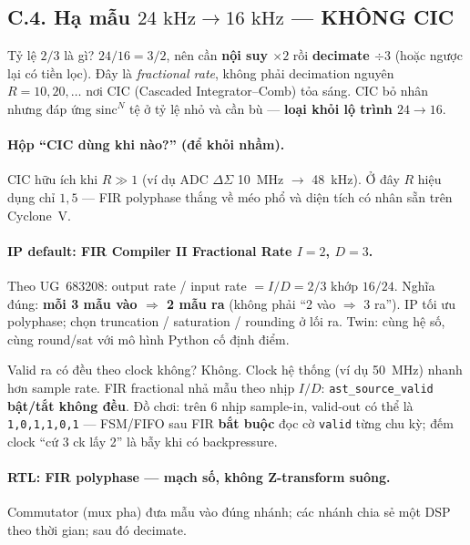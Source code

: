 \subsection*{C.4. Hạ mẫu $24\text{ kHz}\to 16\text{ kHz}$ --- KHÔNG CIC}

\begin{firstprin}{Tỷ lệ $2/3$ là gì?}
$24/16 = 3/2$, nên cần \textbf{nội suy $\times 2$} rồi \textbf{decimate $\div 3$} (hoặc ngược lại có tiền lọc). Đây là \emph{fractional rate}, không phải decimation nguyên $R=10,20,\ldots$ nơi CIC (Cascaded Integrator--Comb) tỏa sáng. CIC bỏ nhân nhưng đáp ứng $\mathrm{sinc}^N$ tệ ở tỷ lệ nhỏ và cần bù --- \textbf{loại khỏi lộ trình $24\to16$}.
\end{firstprin}

\paragraph{Hộp ``CIC dùng khi nào?'' (để khỏi nhầm).}
CIC hữu ích khi $R\gg 1$ (ví dụ ADC $\Delta\Sigma$ 10~MHz $\to$ 48~kHz). Ở đây $R$ hiệu dụng chỉ $1{,}5$ --- FIR polyphase thắng về méo phổ và diện tích có nhân sẵn trên Cyclone~V.

\paragraph{IP default: FIR Compiler II Fractional Rate $I=2$, $D=3$.}
Theo UG~683208: output rate / input rate $= I/D = 2/3$ khớp $16/24$. Nghĩa đúng: \textbf{mỗi 3 mẫu vào $\Rightarrow$ 2 mẫu ra} (không phải ``2 vào $\Rightarrow$ 3 ra''). IP tối ưu polyphase; chọn truncation / saturation / rounding ở lối ra. Twin: cùng hệ số, cùng round/sat với mô hình Python cố định điểm.

\begin{firstprin}{Valid ra có đều theo clock không?}
Không. Clock hệ thống (ví dụ 50~MHz) nhanh hơn sample rate. FIR fractional nhả mẫu theo nhịp $I/D$: \texttt{ast\_source\_valid} \textbf{bật/tắt không đều}. Đồ chơi: trên 6 nhịp sample-in, valid-out có thể là \texttt{1,0,1,1,0,1} --- FSM/FIFO sau FIR \textbf{bắt buộc} đọc cờ \texttt{valid} từng chu kỳ; đếm clock ``cứ 3 ck lấy 2'' là bẫy khi có backpressure.
\end{firstprin}

\paragraph{RTL: FIR polyphase --- mạch số, không Z-transform suông.}
Commutator (mux pha) đưa mẫu vào đúng nhánh; các nhánh chia sẻ một DSP theo thời gian; sau đó decimate.

